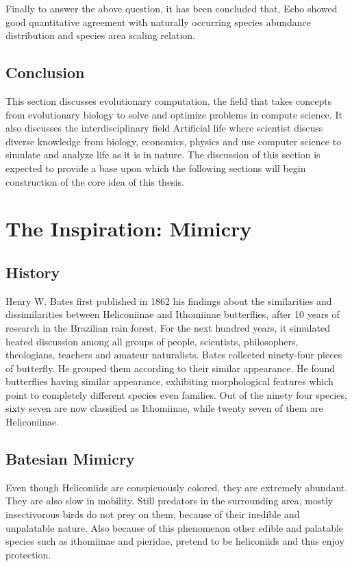 \documentclass[letterpaper]{article}
\numberwithin{equation}{section}
\begin{document}
Finally to answer the above question, it has been concluded that, Echo showed good quantitative agreement with naturally occurring species abundance distribution and species area scaling relation.

\subsection{Conclusion}
This section discusses evolutionary computation, the field that takes concepts from evolutionary biology to solve and optimize problems in compute science. It also discusses the interdisciplinary field Artificial life where scientist discuss diverse knowledge from biology, economics, physics and use computer science to simulate and analyze life as it is in nature. The discussion of this section is expected to provide a base upon which the following sections will begin construction of the core idea of this thesis.

\section{The Inspiration: Mimicry}
\label{section:mimicry}

\subsection{History}
Henry W. Bates first published in 1862 his findings about the similarities and dissimilarities between Heliconiinae and Ithomiinae butterflies, after 10 years of research in the Brazilian rain forest. For the next hundred years, it simulated heated discussion among all groups of people, scientists, philosophers, theologians, teachers and amateur naturalists. Bates collected ninety-four pieces of butterfly. He grouped them according to their similar appearance. He found butterflies having similar appearance, exhibiting morphological features which point to completely different species even families. Out of the ninety four species, sixty seven are now classified as Ithomiinae, while twenty seven of them are Heliconiinae.

\subsection{Batesian Mimicry}
Even though Heliconiids are conspicuously colored, they are extremely abundant. They are also slow in mobility. Still predators in the surrounding area, mostly insectivorous birds do not prey on them, because of their inedible and unpalatable nature. Also because of this phenomenon other edible and palatable species such as ithomiinae and pieridae, pretend to be heliconiids and thus enjoy protection.
\end{document}
